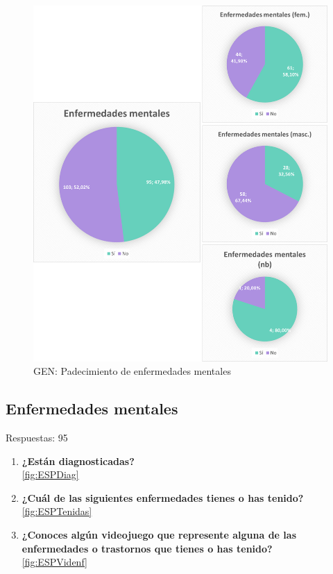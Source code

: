 \documentclass[12pt, a4paper,twoside,titlepage]{book}
\begin{document}
\begin{figure}
    \centering
    \includegraphics[width=1\linewidth]{ANEXO ESP/20AnexESPEnf}
    \caption{GEN: Padecimiento de enfermedades mentales}
    \label{fig:ESPEnf}
\end{figure}


\subsection{Enfermedades mentales}
Respuestas: 95
\begin{enumerate}[label=\textbf{\arabic*}.]
      \item \textbf{¿Están diagnosticadas? }\\
      \ref{fig:ESPDiag}
     \item \textbf{¿Cuál de las siguientes enfermedades tienes o has tenido?}\\
     \ref{fig:ESPTenidas}
     \item \textbf{¿Conoces algún videojuego que represente alguna de las enfermedades o trastornos que tienes o has tenido?}\\
     \ref{fig:ESPVidenf}
\end{enumerate}
\end{document}
